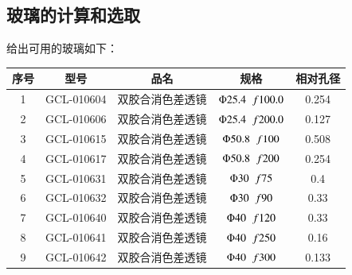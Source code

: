 \documentclass{article}
\begin{document}
\subsection{玻璃的计算和选取}
给出可用的玻璃如下：
% 
\begin{table}[H]
  \centering
  \begin{tabular}{|c|cccc|}
  \hline
  序号&型号&品名&规格&相对孔径\\ \hline
  1&GCL-010604&
  双胶合消色差透镜&
  $\Phi 25.4 \hspace{0.2cm}  f100.0$& 0.254\\
  2&GCL-010606&
  双胶合消色差透镜&
  $\Phi 25.4 \hspace{0.2cm}  f 200.0$& 0.127\\
  3&GCL-010615&
  双胶合消色差透镜&
  $\Phi 50.8 \hspace{0.2cm}  f 100$& 0.508\\

  4&GCL-010617&
  双胶合消色差透镜&
  $\Phi 50.8 \hspace{0.2cm}  f 200$& 0.254\\

  5&GCL-010631&
  双胶合消色差透镜&
  $\Phi 30 \hspace{0.2cm}  f 75$& 0.4\\

  6&GCL-010632&
  双胶合消色差透镜&
  $\Phi 30 \hspace{0.2cm}  f 90$& 0.33\\

  7&GCL-010640&
  双胶合消色差透镜&
  $\Phi 40 \hspace{0.2cm}  f 120$& 0.33\\

  8&GCL-010641&
  双胶合消色差透镜&
  $\Phi 40 \hspace{0.2cm}  f 250$& 0.16\\

  9&GCL-010642&
  双胶合消色差透镜&
  $\Phi 40 \hspace{0.2cm}  f 300$& 0.133\\


\end{tabular}
\end{table}
\end{document}
